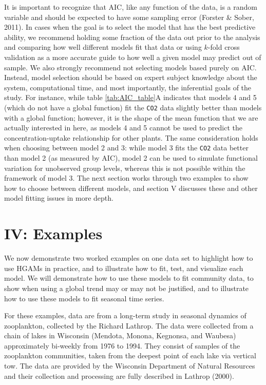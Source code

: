 \documentclass[12pt]{article}
\begin{document}
It is important to recognize that AIC, like any function of the data, is
a random variable and should be expected to have some sampling error
(Forster \& Sober, 2011). In cases when the goal is to select the model
that has the best predictive ability, we recommend holding some fraction
of the data out prior to the analysis and comparing how well different
models fit that data or using \(k\)-fold cross validation as a more
accurate guide to how well a given model may predict out of sample. We
also strongly recommend not selecting models based purely on AIC.
Instead, model selection should be based on expert subject knowledge
about the system, computational time, and most importantly, the
inferential goals of the study. For instance, while table
\ref{tab:AIC_table}A indicates that models 4 and 5 (which do not have a
global function) fit the \texttt{CO2} data slightly better than models
with a global function; however, it is the shape of the mean function
that we are actually interested in here, as models 4 and 5 cannot be
used to predict the concentration-uptake relationship for other plants.
The same consideration holds when choosing between model 2 and 3: while
model 3 fits the \texttt{CO2} data better than model 2 (as measured by
AIC), model 2 can be used to simulate functional variation for
unobserved group levels, whereas this is not possible within the
framework of model 3. The next section works through two examples to
show how to choose between different models, and section V discusses
these and other model fitting issues in more depth.

\FloatBarrier

\section{IV: Examples}\label{iv-examples}

We now demonstrate two worked examples on one data set to highlight how
to use HGAMs in practice, and to illustrate how to fit, test, and
visualize each model. We will demonstrate how to use these models to fit
community data, to show when using a global trend may or may not be
justified, and to illustrate how to use these models to fit seasonal
time series.

For these examples, data are from a long-term study in seasonal dynamics
of zooplankton, collected by the Richard Lathrop. The data were
collected from a chain of lakes in Wisconsin (Mendota, Monona, Kegnonsa,
and Waubesa) approximately bi-weekly from 1976 to 1994. They consist of
samples of the zooplankton communities, taken from the deepest point of
each lake via vertical tow. The data are provided by the Wisconsin
Department of Natural Resources and their collection and processing are
fully described in Lathrop (2000).
\end{document}
